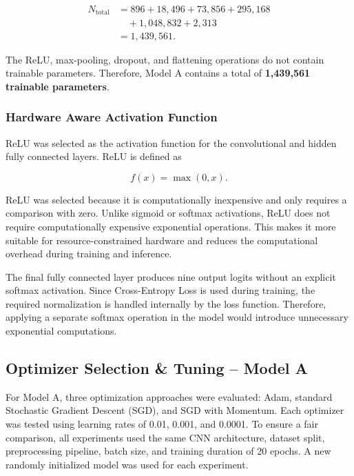 \documentclass[12pt,a4paper]{article}
\begin{document}
\begin{align*}
N_{\mathrm{total}} &=
896 + 18,496 + 73,856 + 295,168\\
&\quad + 1,048,832 + 2,313\\
&= \boxed{1,439,561}.
\end{align*}

The ReLU, max-pooling, dropout, and flattening operations do not contain
trainable parameters. Therefore, Model A contains a total of
\textbf{1,439,561 trainable parameters}.

\subsubsection{Hardware Aware Activation Function}

ReLU was selected as the activation function for the convolutional and
hidden fully connected layers. ReLU is defined as

\begin{equation}
f(x)=\max(0,x).
\end{equation}

ReLU was selected because it is computationally inexpensive and only
requires a comparison with zero. Unlike sigmoid or softmax activations,
ReLU does not require computationally expensive exponential operations.
This makes it more suitable for resource-constrained hardware and reduces
the computational overhead during training and inference.

The final fully connected layer produces nine output logits without an
explicit softmax activation. Since Cross-Entropy Loss is used during
training, the required normalization is handled internally by the loss
function. Therefore, applying a separate softmax operation in the model
would introduce unnecessary exponential computations.

\subsection{Optimizer Selection \& Tuning -- Model A}

For Model A, three optimization approaches were evaluated: Adam, standard
Stochastic Gradient Descent (SGD), and SGD with Momentum. Each optimizer was
tested using learning rates of 0.01, 0.001, and 0.0001. To ensure a fair
comparison, all experiments used the same CNN architecture, dataset split,
preprocessing pipeline, batch size, and training duration of 20 epochs. A new
randomly initialized model was used for each experiment.
\end{document}
